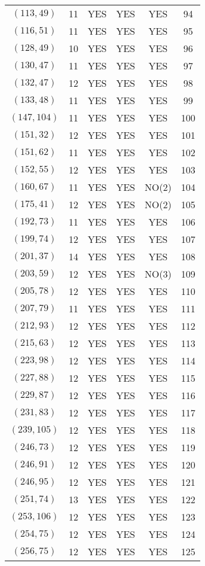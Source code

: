 \begin{longtable}{|c|c|c|c|c|c|}
$(113, 49)$ & 11 & YES & YES & YES & 94\\
$(116, 51)$ & 11 & YES & YES & YES & 95\\
$(128, 49)$ & 10 & YES & YES & YES & 96\\
$(130, 47)$ & 11 & YES & YES & YES & 97\\
$(132, 47)$ & 12 & YES & YES & YES & 98\\
$(133, 48)$ & 11 & YES & YES & YES & 99\\
$(147, 104)$ & 11 & YES & YES & YES & 100\\
$(151, 32)$ & 12 & YES & YES & YES & 101\\
$(151, 62)$ & 11 & YES & YES & YES & 102\\
$(152, 55)$ & 12 & YES & YES & YES & 103\\
$(160, 67)$ & 11 & YES & YES & NO(2) & 104\\
$(175, 41)$ & 12 & YES & YES & NO(2) & 105\\
$(192, 73)$ & 11 & YES & YES & YES & 106\\
$(199, 74)$ & 12 & YES & YES & YES & 107\\
$(201, 37)$ & 14 & YES & YES & YES & 108\\
$(203, 59)$ & 12 & YES & YES & NO(3) & 109\\
$(205, 78)$ & 12 & YES & YES & YES & 110\\
$(207, 79)$ & 11 & YES & YES & YES & 111\\
$(212, 93)$ & 12 & YES & YES & YES & 112\\
$(215, 63)$ & 12 & YES & YES & YES & 113\\
$(223, 98)$ & 12 & YES & YES & YES & 114\\
$(227, 88)$ & 12 & YES & YES & YES & 115\\
$(229, 87)$ & 12 & YES & YES & YES & 116\\
$(231, 83)$ & 12 & YES & YES & YES & 117\\
$(239, 105)$ & 12 & YES & YES & YES & 118\\
$(246, 73)$ & 12 & YES & YES & YES & 119\\
$(246, 91)$ & 12 & YES & YES & YES & 120\\
$(246, 95)$ & 12 & YES & YES & YES & 121\\
$(251, 74)$ & 13 & YES & YES & YES & 122\\
$(253, 106)$ & 12 & YES & YES & YES & 123\\
$(254, 75)$ & 12 & YES & YES & YES & 124\\
$(256, 75)$ & 12 & YES & YES & YES & 125\\

\end{longtable}
